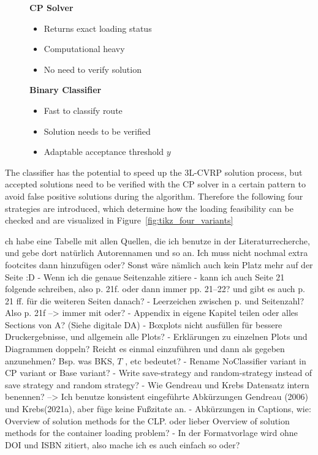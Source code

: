 \begin{figure}[ht]
    \centering
    \begin{minipage}[centering]{0.45\textwidth}
        \textbf{CP Solver}
        \begin{itemize}
            \item Returns exact loading status
            \item Computational heavy
            \item No need to verify solution
        \end{itemize}
    \end{minipage}
    \begin{minipage}[centering]{0.45\textwidth}
        \textbf{Binary Classifier}
        \begin{itemize}
            \item Fast to classify route
            \item Solution needs to be verified
            \item Adaptable acceptance threshold $y$
        \end{itemize}
    \end{minipage}
\end{figure}

The classifier has the potential to speed up the \gls{3L-CVRP} solution process, but accepted solutions need to be
verified with the \gls{CP} solver in a certain pattern to avoid false positive solutions during the algorithm.
Therefore the following four strategies are introduced, which determine how the loading feasibility can be checked and are
visualized in Figure~\ref{fig:tikz_four_variants}

ch habe eine Tabelle mit allen Quellen, die ich benutze in der Literaturrecherche, und gebe dort natürlich Autorennamen und so an. Ich muss nicht nochmal extra footcites dann hinzufügen oder? Sonst wäre nämlich auch kein Platz mehr auf der Seite :D
- Wenn ich die genaue Seitenzahle zitiere - kann ich auch Seite 21 folgende schreiben, also p. 21f. oder dann immer pp. 21--22? und gibt es auch p. 21 ff. für die weiteren Seiten danach?
- Leerzeichen zwischen p. und Seitenzahl? Also p. 21f --> immer mit oder?
- Appendix in eigene Kapitel teilen oder alles Sections von A? (Siehe digitale DA)
- Boxplots nicht ausfüllen für bessere Druckergebnisse, und allgemein alle Plots?
- Erklärungen zu einzelnen Plots und Diagrammen doppeln? Reicht es einmal einzuführen und dann als gegeben anzunehmen? Bsp. was BKS, $T$ , etc bedeutet?
- Rename NoClassifier variant in CP variant or Base variant?
- Write save-strategy and random-strategy instead of save strategy and random strategy?
- Wie Gendreau und Krebs Datensatz intern benennen? --> Ich benutze konsistent eingeführte Abkürzungen Gendreau (2006) und Krebs(2021a), aber füge keine Fußzitate an.
- Abkürzungen in Captions, wie:  Overview of solution methods for the CLP. oder lieber  Overview of solution methods for the container loading problem?
- In der Formatvorlage wird ohne DOI und ISBN zitiert, also mache ich es auch einfach so oder?


